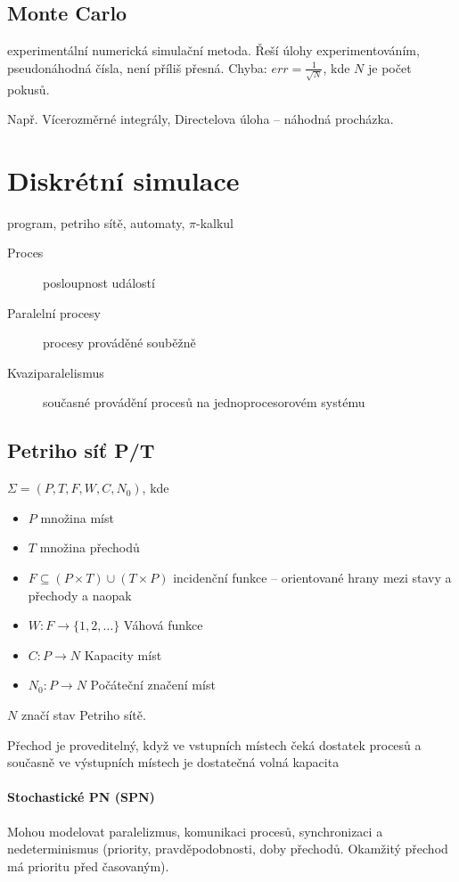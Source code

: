 \documentclass[a4wide]{report}
\begin{document}
\subsection{Monte Carlo}

experimentální numerická simulační metoda. Řeší úlohy experimentováním, pseudonáhodná čísla, není příliš přesná. Chyba: $err = \frac{1}{\sqrt{N}}$, kde $N$ je počet pokusů.

Např. Vícerozměrné integrály, Directelova úloha -- náhodná procházka.

\section{Diskrétní simulace}

program, petriho sítě, automaty, $\pi$-kalkul

\begin{description}
	\item[Proces] posloupnost událostí
	\item[Paralelní procesy] procesy prováděné souběžně
	\item[Kvaziparalelismus] současné provádění procesů na jednoprocesorovém systému
\end{description}

\subsection{Petriho síť P/T}
$\Sigma = (P, T, F, W, C, N_0)$, kde
\begin{itemize}
	\item $P$ množina míst
	\item $T$ množina přechodů 
	\item $F \subseteq (P \times T) \cup (T \times P)$ incidenční funkce -- orientované hrany mezi stavy a přechody a naopak
	\item $W : F \to \{1, 2, \dots \}$ Váhová funkce
	\item $C : P \to N$ Kapacity míst
	\item $N_0: P \to N$ Počáteční značení míst
\end{itemize}

$N$ značí stav Petriho sítě.

Přechod je proveditelný, když ve vstupních místech čeká dostatek procesů a současně ve výstupních místech je dostatečná volná kapacita

\paragraph{Stochastické PN (SPN)} Mohou modelovat paralelizmus, komunikaci procesů, synchronizaci a nedeterminismus (priority, pravděpodobnosti, doby přechodů. Okamžitý přechod má prioritu před časovaným).
\end{document}
